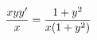 \documentclass[preview]{standalone}
\begin{document}
\begin{align*}
\special{dvisvgm:raw <g id='unique000'>}\frac{xyy'}{x}=\frac{1+y^2}{x(1+y^2)}\special{dvisvgm:raw </g>}
\end{align*}
\end{document}
